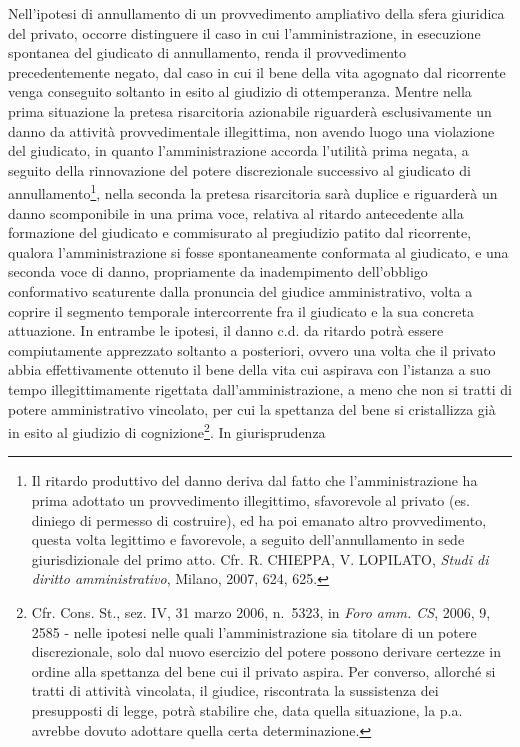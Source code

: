 \documentclass[12pt,it,a4paper,]{report}
\begin{document}
Nell'ipotesi di annullamento di un provvedimento ampliativo della sfera
giuridica del privato, occorre distinguere il caso in cui
l'amministrazione, in esecuzione spontanea del giudicato di
annullamento, renda il provvedimento precedentemente negato, dal caso in
cui il bene della vita agognato dal ricorrente venga conseguito soltanto
in esito al giudizio di ottemperanza. Mentre nella prima situazione la
pretesa risarcitoria azionabile riguarderà esclusivamente un danno da
attività provvedimentale illegittima, non avendo luogo una violazione
del giudicato, in quanto l'amministrazione accorda l'utilità prima
negata, a seguito della rinnovazione del potere discrezionale successivo
al giudicato di annullamento\footnote{Il ritardo produttivo del danno
  deriva dal fatto che l'amministrazione ha prima adottato un
  provvedimento illegittimo, sfavorevole al privato (es. diniego di
  permesso di costruire), ed ha poi emanato altro provvedimento, questa
  volta legittimo e favorevole, a seguito dell'annullamento in sede
  giurisdizionale del primo atto. Cfr. R. CHIEPPA, V. LOPILATO,
  \emph{Studi di diritto amministrativo}, Milano, 2007, 624, 625.},
nella seconda la pretesa risarcitoria sarà duplice e riguarderà un danno
scomponibile in una prima voce, relativa al ritardo antecedente alla
formazione del giudicato e commisurato al pregiudizio patito dal
ricorrente, qualora l'amministrazione si fosse spontaneamente conformata
al giudicato, e una seconda voce di danno, propriamente da inadempimento
dell'obbligo conformativo scaturente dalla pronuncia del giudice
amministrativo, volta a coprire il segmento temporale intercorrente fra
il giudicato e la sua concreta attuazione. In entrambe le ipotesi, il
danno c.d. da ritardo potrà essere compiutamente apprezzato soltanto a
posteriori, ovvero una volta che il privato abbia effettivamente
ottenuto il bene della vita cui aspirava con l'istanza a suo tempo
illegittimamente rigettata dall'amministrazione, a meno che non si
tratti di potere amministrativo vincolato, per cui la spettanza del bene
si cristallizza già in esito al giudizio di cognizione\footnote{Cfr.
  Cons. St., sez. IV, 31 marzo 2006, n.~5323, in \emph{Foro amm. CS},
  2006, 9, 2585 - nelle ipotesi nelle quali l'amministrazione sia
  titolare di un potere discrezionale, solo dal nuovo esercizio del
  potere possono derivare certezze in ordine alla spettanza del bene cui
  il privato aspira. Per converso, allorché si tratti di attività
  vincolata, il giudice, riscontrata la sussistenza dei presupposti di
  legge, potrà stabilire che, data quella situazione, la p.a. avrebbe
  dovuto adottare quella certa determinazione.}. In giurisprudenza
\end{document}

